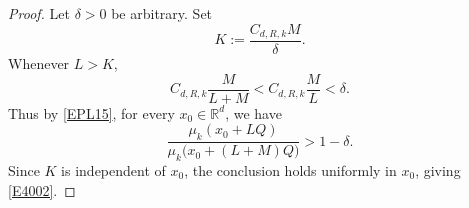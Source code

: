 \documentclass[10pt,a4paper]{amsart}
\begin{document}
\begin{proof}
Let $\delta>0$ be arbitrary. Set
\[
K:=\frac{C_{d,R,k}M}{\delta}.
\]
Whenever $L>K$,
\[
C_{d,R,k}\frac{M}{L+M}<C_{d,R,k}\frac{M}{L}<\delta.
\]
Thus by \eqref{EPL15}, for every $x_0\in\mathbb{R}^d$, we have
\[
\frac{\mu_k(x_0+LQ)}{\mu_k\bigl(x_0+(L+M)Q\bigr)}>1-\delta.
\]
Since $K$ is independent of $x_0$, the conclusion holds uniformly in $x_0$, giving \eqref{E4002}.

\end{proof}
\end{document}
